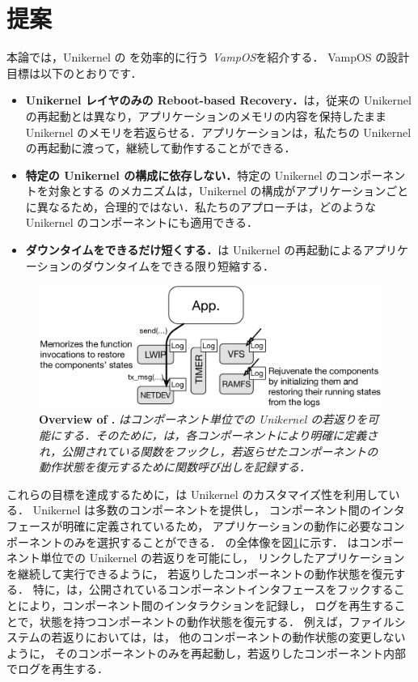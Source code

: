 \section{提案} \label{section:proposal}

本論では，Unikernel の \rr を効率的に行う \emph{VampOS}を紹介する．
VampOS の設計目標は以下のとおりです．

\begin{itemize}
    \item \textbf{Unikernel レイヤのみの Reboot-based Recovery．}{\sysname は，従来の Unikernel の再起動とは異なり，アプリケーションのメモリの内容を保持したまま Unikernel のメモリを若返らせる．アプリケーションは，私たちの Unikernel の再起動に渡って，継続して動作することができる．}
    \item \textbf{特定の Unikernel の構成に依存しない．}{特定の Unikernel のコンポーネントを対象とする \rr のメカニズムは，Unikernel の構成がアプリケーションごとに異なるため，合理的ではない．私たちのアプローチは，どのような Unikernel のコンポーネントにも適用できる．}
    \item \textbf{ダウンタイムをできるだけ短くする．}{\sysname は Unikernel の再起動によるアプリケーションのダウンタイムをできる限り短縮する．}
\end{itemize}

\begin{figure}[t]
    \begin{center}
      \includegraphics[scale=0.3]{./img/vampos.eps}
      \caption{\textbf{Overview of {\sysname}.} \textit{{\sysname} はコンポーネント単位での Unikernel の若返りを可能にする．そのために，\sysname は，各コンポーネントにより明確に定義され，公開されている関数をフックし，若返らせたコンポーネントの動作状態を復元するために関数呼び出しを記録する．}}
      \label{fig:overview}
    \end{center}
\end{figure}

これらの目標を達成するために，\sysname は Unikernel のカスタマイズ性を利用している．
Unikernel は多数のコンポーネントを提供し，
コンポーネント間のインタフェースが明確に定義されているため，
アプリケーションの動作に必要なコンポーネントのみを選択することができる．
\sysname の全体像を図\ref{fig:overview}に示す．
\sysname はコンポーネント単位での Unikernel の若返りを可能にし，
リンクしたアプリケーションを継続して実行できるように，
若返りしたコンポーネントの動作状態を復元する．
特に，\sysname は，公開されているコンポーネントインタフェースをフックすることにより，コンポーネント間のインタラクションを記録し，
ログを再生することで，状態を持つコンポーネントの動作状態を復元する．
例えば，ファイルシステムの若返りにおいては，\sysname は，
他のコンポーネントの動作状態の変更しないように，
そのコンポーネントのみを再起動し，若返りしたコンポーネント内部でログを再生する．

